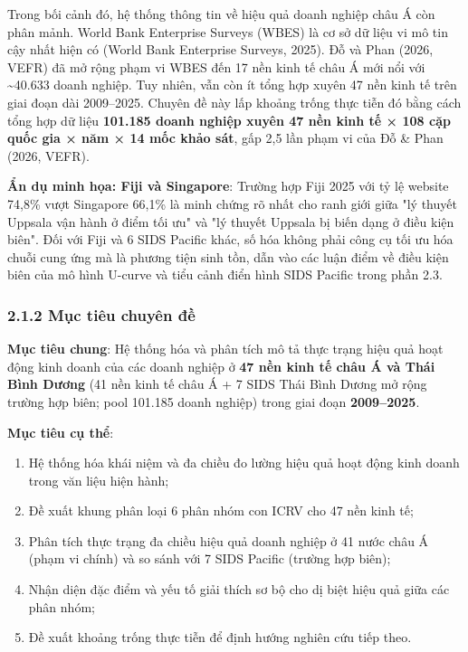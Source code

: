 \documentclass[12pt,a4paper]{article}
\providecommand{\tightlist}{\setlength{\itemsep}{0pt}\setlength{\parskip}{0pt}}
\begin{document}
Trong bối cảnh đó, hệ thống thông tin về hiệu quả doanh nghiệp châu Á
còn phân mảnh. World Bank Enterprise Surveys (WBES) là cơ sở dữ liệu vi
mô tin cậy nhất hiện có (World Bank Enterprise Surveys, 2025). Đỗ và
Phan (2026, VEFR) đã mở rộng phạm vi WBES đến 17 nền kinh tế châu Á mới
nổi với \textasciitilde40.633 doanh nghiệp. Tuy nhiên, vẫn còn ít tổng
hợp xuyên 47 nền kinh tế trên giai đoạn dài 2009--2025. Chuyên đề này
lấp khoảng trống thực tiễn đó bằng cách tổng hợp dữ liệu \textbf{101.185
doanh nghiệp xuyên 47 nền kinh tế × 108 cặp quốc gia × năm × 14 mốc khảo
sát}, gấp 2,5 lần phạm vi của Đỗ \& Phan (2026, VEFR).

\textbf{Ẩn dụ minh họa: Fiji và Singapore}: Trường hợp Fiji 2025 với tỷ
lệ website 74,8\% vượt Singapore 66,1\% là minh chứng rõ nhất cho ranh
giới giữa "lý thuyết Uppsala vận hành ở điểm tối ưu" và "lý thuyết
Uppsala bị biến dạng ở điều kiện biên". Đối với Fiji và 6 SIDS Pacific
khác, số hóa không phải công cụ tối ưu hóa chuỗi cung ứng mà là phương
tiện sinh tồn, dẫn vào các luận điểm về điều kiện biên của mô hình
U-curve và tiểu cảnh điển hình SIDS Pacific trong phần 2.3.

\hypertarget{212-mux1ee5c-tiuxeau-chuyuxean-ux111ux1ec1}{%
\subsubsection{2.1.2 Mục tiêu chuyên
đề}\label{212-mux1ee5c-tiuxeau-chuyuxean-ux111ux1ec1}}

\textbf{Mục tiêu chung}: Hệ thống hóa và phân tích mô tả thực trạng hiệu
quả hoạt động kinh doanh của các doanh nghiệp ở \textbf{47 nền kinh tế
châu Á và Thái Bình Dương} (41 nền kinh tế châu Á + 7 SIDS Thái Bình
Dương mở rộng trường hợp biên; pool 101.185 doanh nghiệp) trong giai
đoạn \textbf{2009--2025}.

\textbf{Mục tiêu cụ thể}:

\begin{enumerate}
\def\labelenumi{\arabic{enumi}.}
\tightlist
\item
  Hệ thống hóa khái niệm và đa chiều đo lường hiệu quả hoạt động kinh
  doanh trong văn liệu hiện hành;
\item
  Đề xuất khung phân loại 6 phân nhóm con ICRV cho 47 nền kinh tế;
\item
  Phân tích thực trạng đa chiều hiệu quả doanh nghiệp ở 41 nước châu Á
  (phạm vi chính) và so sánh với 7 SIDS Pacific (trường hợp biên);
\item
  Nhận diện đặc điểm và yếu tố giải thích sơ bộ cho dị biệt hiệu quả
  giữa các phân nhóm;
\item
  Đề xuất khoảng trống thực tiễn để định hướng nghiên cứu tiếp theo.
\end{enumerate}
\end{document}
